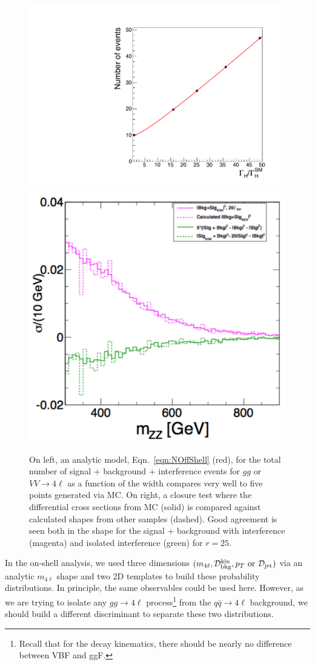 \begin{figure}[htbp]
\begin{center}
\includegraphics[width=.45\linewidth]{HiggsProperties/figures/yield.pdf}
\includegraphics[width=.45\linewidth]{HiggsProperties/figures/closuretestNHetNI.pdf}
\caption[Modeling of Off-Shell Normalizations in $4\ell$]{On left, an analytic model, Eqn.~\ref{eqn:NOffShell} (red), for the total number of signal + background + interference events for $gg$ or $VV\rightarrow 4\ell$ as a function of the width compares very well to five points generated via MC. On right, a closure test where the differential cross sections from MC (solid) is compared against calculated shapes from other samples (dashed). Good agreement is seen both in the shape for the signal + background with interference (magenta) and isolated interference (green) for $r=25$.}
\label{fig:NOffShell}
\end{center}
\end{figure}

In the on-shell analysis, we used three dimensions $(m_{4\ell},\mathcal{D}_{\rm{bkg}}^{\rm{kin}},p_T \mathrm{~or~} \mathcal{D}_{\rm jet})$ via an analytic $m_{4\ell}$ shape and two 2D templates to build these probability distributions. In principle, the same observables could be used here. However, as we are trying to isolate any $gg\rightarrow 4\ell$ process\footnote{Recall that for the decay kinematics, there should be nearly no difference between VBF and ggF.} from the $q\bar{q}\rightarrow 4\ell$ background, we should build a different discriminant to separate these two distributions.  

